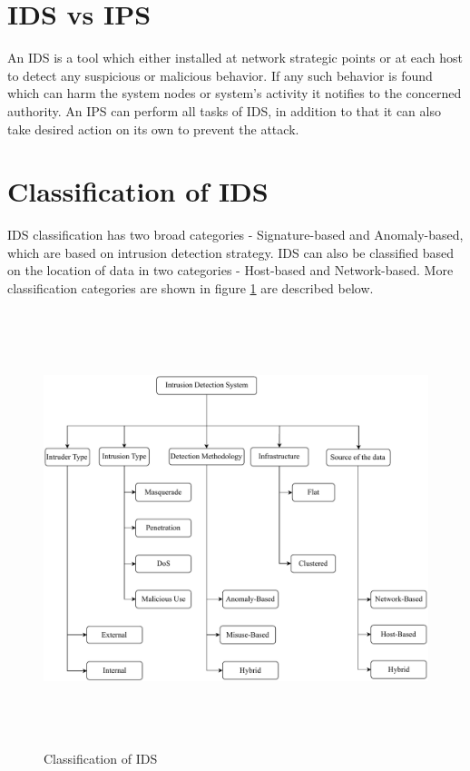 \section{IDS vs IPS}
An IDS is a tool which either installed at network strategic points or at each host to detect any suspicious or malicious behavior. If any such behavior is found which can harm the system nodes or system's activity it notifies to the concerned authority. An IPS can perform all tasks of IDS, in addition to that it can also take desired action on its own to prevent the attack.
\section{Classification of IDS}
IDS classification has two broad categories - Signature-based and Anomaly-based, which are based on intrusion detection strategy. IDS can also be classified based on the location of data in two categories - Host-based and Network-based. More classification categories are shown in figure \ref{IDS-Classification} \cite{alrajeh2013intrusion, farooqi2009intrusion} are described below.

\begin{figure}[h]
\center	
\includegraphics[width=\textwidth, height=5in] {Figures/PDF/IDS_Classification.pdf}
\caption{Classification of IDS}
\label{IDS-Classification}	
\end{figure}

